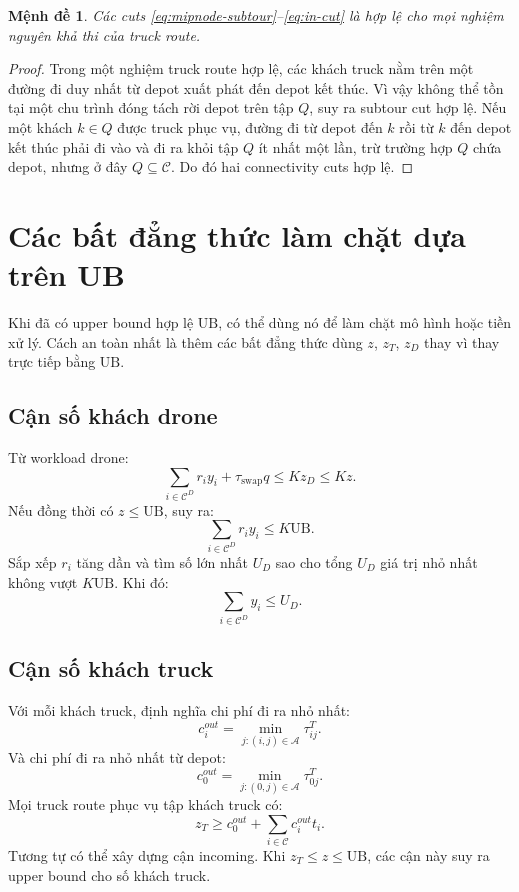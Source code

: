 \documentclass[12pt,a4paper]{article}
\newtheorem{proposition}{Mệnh đề}
\newcommand{\C}{\mathcal{C}}
\newcommand{\CD}{\mathcal{C}^{D}}
\newcommand{\A}{\mathcal{A}}
\newcommand{\UB}{\mathrm{UB}}
\begin{document}
\begin{proposition}
Các cuts \eqref{eq:mipnode-subtour}--\eqref{eq:in-cut} là hợp lệ cho mọi nghiệm nguyên khả thi của truck route.
\end{proposition}
\begin{proof}
Trong một nghiệm truck route hợp lệ, các khách truck nằm trên một đường đi duy nhất từ depot xuất phát đến depot kết thúc. Vì vậy không thể tồn tại một chu trình đóng tách rời depot trên tập $Q$, suy ra subtour cut hợp lệ. Nếu một khách $k\in Q$ được truck phục vụ, đường đi từ depot đến $k$ rồi từ $k$ đến depot kết thúc phải đi vào và đi ra khỏi tập $Q$ ít nhất một lần, trừ trường hợp $Q$ chứa depot, nhưng ở đây $Q\subseteq \C$. Do đó hai connectivity cuts hợp lệ.
\end{proof}

\section{Các bất đẳng thức làm chặt dựa trên UB}
\label{sec:ub-tightening}

Khi đã có upper bound hợp lệ $\UB$, có thể dùng nó để làm chặt mô hình hoặc tiền xử lý. Cách an toàn nhất là thêm các bất đẳng thức dùng $z$, $z_T$, $z_D$ thay vì thay trực tiếp bằng $\UB$.

\subsection{Cận số khách drone}
Từ workload drone:
\[
    \sum_{i\in \CD}r_i y_i+\tau_{\mathrm{swap}}q\le Kz_D\le Kz.
\]
Nếu đồng thời có $z\le \UB$, suy ra:
\[
    \sum_{i\in \CD}r_i y_i\le K\UB.
\]
Sắp xếp $r_i$ tăng dần và tìm số lớn nhất $U_D$ sao cho tổng $U_D$ giá trị nhỏ nhất không vượt $K\UB$. Khi đó:
\begin{equation}
    \sum_{i\in \CD}y_i\le U_D.
    \label{eq:drone-cardinality-ub}
\end{equation}

\subsection{Cận số khách truck}
Với mỗi khách truck, định nghĩa chi phí đi ra nhỏ nhất:
\[
    c_i^{out}=\min_{j:(i,j)\in\A}\tau^T_{ij}.
\]
Và chi phí đi ra nhỏ nhất từ depot:
\[
    c_0^{out}=\min_{j:(0,j)\in\A}\tau^T_{0j}.
\]
Mọi truck route phục vụ tập khách truck có:
\begin{equation}
    z_T\ge c_0^{out}+\sum_{i\in\C}c_i^{out}t_i.
    \label{eq:truck-out-lb}
\end{equation}
Tương tự có thể xây dựng cận incoming. Khi $z_T\le z\le \UB$, các cận này suy ra upper bound cho số khách truck.
\end{document}
